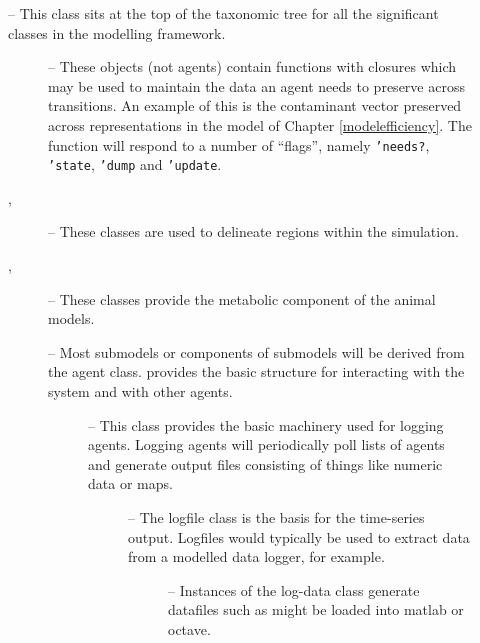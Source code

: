 \begin{description}
\item[] -- This class sits at the top of the taxonomic tree
  for all the significant classes in the modelling framework.

  \begin{description}
  \item[] -- These objects (not agents) contain
    functions with closures which may be used to maintain the data an
    agent needs to preserve across transitions.  An example of this is
    the contaminant vector preserved across representations in the model
    of Chapter \ref{modelefficiency}.  The function will respond to a
    number of ``flags'', namely \texttt{'needs?}, \texttt{'state},
    \texttt{'dump} and \texttt{'update}.

  \item[, ] -- These classes are used to
    delineate regions within the simulation.  

  \item[, ] -- These classes
    provide the metabolic component of the animal models.
    
    
  \item[] -- Most submodels or components of submodels
    will be derived from the agent class.   provides the
    basic structure for interacting with the system and with other
    agents.

    \begin{description}
    \item[] -- This class provides the basic machinery
      used for logging agents.  Logging agents will periodically poll
      lists of agents and generate output files consisting of things
      like numeric data or maps.

      \begin{description}
      \item[] -- The logfile class is the basis for the
        time-series output. Logfiles would typically be used to
        extract data from a modelled data logger, for example.
        
        \begin{description}
        \item[] -- Instances of the log-data class
          generate datafiles such as might be loaded into matlab or
          octave.
        \end{description}
        

\end{description}
\end{description}
\end{description}
\end{description}
